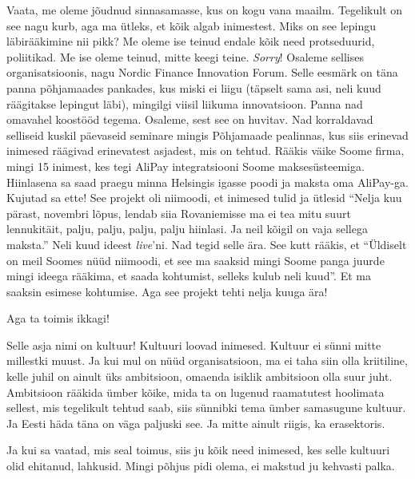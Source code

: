 Vaata, me oleme jõudnud sinnasamasse, kus on kogu vana maailm. Tegelikult on see nagu kurb, aga ma ütleks, et  kõik algab  inimestest. Miks on see lepingu läbirääkimine nii pikk? Me oleme ise teinud endale kõik need protseduurid, poliitikad. Me ise oleme teinud, mitte keegi teine. \emph{Sorry}! Osaleme sellises organisatsioonis, nagu Nordic Finance Innovation Forum. Selle eesmärk on täna panna põhjamaades pankades, kus miski ei liigu (täpselt sama asi, neli kuud räägitakse lepingut läbi), mingilgi viisil liikuma innovatsioon. Panna nad omavahel koostööd tegema. Osaleme, sest see on huvitav. Nad korraldavad selliseid kuskil päevaseid seminare mingis Põhjamaade pealinnas, kus siis erinevad inimesed räägivad erinevatest asjadest, mis on tehtud. Rääkis väike Soome firma, mingi 15 inimest, kes tegi AliPay integratsiooni Soome maksesüsteemiga. Hiinlasena sa saad praegu minna Helsingis igasse poodi ja maksta oma AliPay-ga. Kujutad sa ette! See projekt oli niimoodi, et inimesed tulid ja ütlesid \enquote{Nelja kuu pärast, novembri lõpus, lendab siia Rovaniemisse ma ei tea mitu suurt lennukitäit, palju, palju, palju, palju hiinlasi. Ja neil kõigil on vaja sellega maksta.} Neli kuud ideest \emph{live}'ni. Nad tegid selle ära. See kutt rääkis, et \enquote{Üldiselt on meil Soomes nüüd niimoodi, et see ma saaksid mingi Soome panga juurde mingi ideega rääkima, et saada  kohtumist, selleks kulub neli kuud}. Et ma saaksin esimese kohtumise. Aga see projekt tehti nelja kuuga ära!


Aga ta toimis ikkagi! 


Selle asja nimi on kultuur! Kultuuri loovad inimesed. Kultuur ei sünni mitte millestki muust. Ja kui mul on nüüd organisatsioon, ma ei taha siin olla kriitiline, kelle juhil  on ainult  üks ambitsioon, omaenda isiklik ambitsioon olla suur juht. Ambitsioon rääkida ümber kõike, mida ta on lugenud raamatutest hoolimata sellest, mis tegelikult tehtud saab, siis sünnibki tema ümber samasugune kultuur. Ja Eesti häda täna on väga paljuski see. Ja mitte ainult riigis, ka erasektoris. 


Ja kui sa vaatad, mis seal toimus, siis ju kõik need inimesed, kes selle kultuuri olid ehitanud, lahkusid. Mingi põhjus pidi olema, ei makstud ju kehvasti palka.


